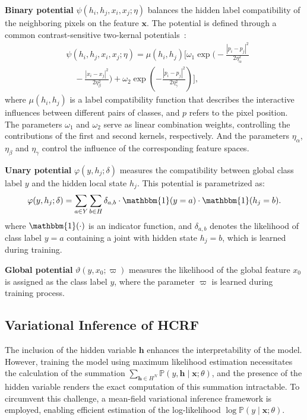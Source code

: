 \documentclass[conference]{IEEEtran}
\newcommand{\hb}{\mathbf{h}}
\newcommand{\PP}{{\mathbb{P}}}
\newcommand{\xb}{\mathbf{x}}
\newcommand{\one}{\mathbbm{1}}
\begin{document}
\textbf{Binary potential} $\psi(h_i, h_j, x_i, x_j; \eta)$ balances the
hidden label compatibility of the neighboring pixels on the feature $\xb$.
The potential is defined through a common contrast-sensitive two-kernal
potentials~\citep{krahenbuhl2011efficient, chen2022end}:
\begin{equation*}
\begin{split}
& \psi(h_i, h_j, x_i, x_j; \eta) = \mu(h_i, h_j) \Bigg[
\omega_1 \exp \bigg(
-\frac{\left\lvert p_i - p_j \right\rvert^2}{2\eta_\alpha^2} \\
&\quad
- \frac{\left\lvert x_i - x_j\right\rvert^2}{2\eta_\beta^2}
\bigg) + \omega_2 \exp \left(
- \frac{\left\lvert p_i - p_j \right\rvert^2}{2 \eta_\gamma^2}
\right)
\Bigg],
\end{split}
\end{equation*}
where $\mu(h_i, h_j)$ is a label compatibility function that describes
the interactive influences between different pairs of classes,
and $p$ refers to the pixel position.
The parameters $\omega_1$ and $\omega_2$ serve as linear combination weights,
controlling the contributions of the first and second kernels, respectively.
And the parameters $\eta_\alpha$, $\eta_\beta$ and $\eta_\gamma$ control the
influence of the corresponding feature spaces.


\textbf{Unary potential} $\varphi(y, h_j; \delta)$ measures the compatibility
between global class label $y$ and the hidden local state $h_j$.
This potential is parametrized as:
\begin{equation*}
\varphi(y, h_{j}; \delta) = \sum_{a \in Y} \sum_{b \in H} \delta_{a, b}
\cdot \one(y = a) \cdot \one(h_j = b).
\end{equation*}
where $\one(\cdot)$ is an indicator function, and $\delta_{a,b}$ denotes the
likelihood of class label $y = a$ containing a joint with hidden state
$h_j = b$, which is learned during training.


\textbf{Global potential} $\vartheta(y, x_0; \varpi)$ measures the likelihood of
the global feature $x_0$ is assigned as the class label $y$, where the parameter
$\varpi$ is learned during training process.


\subsection{Variational Inference of HCRF}


The inclusion of the hidden variable $\hb$ enhances the interpretability of the
model. However, training the model using maximum likelihood estimation
necessitates the calculation of the summation
$\sum_{\hb \in H^N} \PP(y, \hb \mid \xb; \theta)$, and the presence of the
hidden variable renders the exact computation of this summation intractable.
To circumvent this challenge, a mean-field variational inference framework is
employed, enabling efficient estimation of the log-likelihood
$\log \PP(y \mid \xb; \theta)$.
\end{document}
